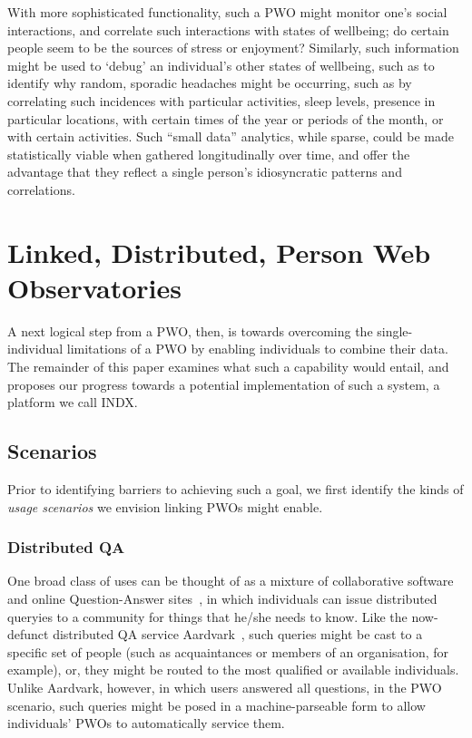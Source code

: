 \documentclass[letterpaper]{sig-alternate}
\begin{document}
With more sophisticated functionality, such a PWO might monitor one's social interactions, and correlate such interactions with states of wellbeing; do certain people seem to be the sources of stress or enjoyment? Similarly, such information might be used to `debug' an individual's other states of wellbeing, such as to identify why random, sporadic headaches might be occurring, such as by correlating such incidences with particular activities, sleep levels, presence in particular locations, with certain times of the year or periods of the month, or with certain activities. Such ``small data'' analytics, while sparse, could be made statistically viable when gathered longitudinally over time, and offer the advantage that they reflect a single person's idiosyncratic patterns and correlations.

\section{Linked, Distributed, Person Web Observatories}

A next logical step from a PWO, then, is towards overcoming the single-individual limitations of a PWO by enabling individuals to combine their data.  The remainder of this paper examines what such a capability would entail, and proposes our progress towards a potential implementation of such a system, a platform we call INDX. 

\subsection{Scenarios}

Prior to identifying barriers to achieving such a goal, we first identify the kinds of \emph{usage scenarios} we envision linking PWOs might enable.  

\subsubsection{Distributed QA}

One broad class of uses can be thought of as a mixture of collaborative software and online Question-Answer sites~\cite{harper2009facts}, in which individuals can issue distributed queryies to a community for things that he/she needs to know.  Like the now-defunct distributed QA service Aardvark~\cite{horowitz2010anatomy}, such queries might be cast to a specific set of people (such as acquaintances or members of an organisation, for example), or, they might be routed to the most qualified or available individuals.  Unlike Aardvark, however, in which users answered all questions, in the PWO scenario, such queries might be posed in a machine-parseable form to allow individuals' PWOs to automatically service them.
\end{document}
